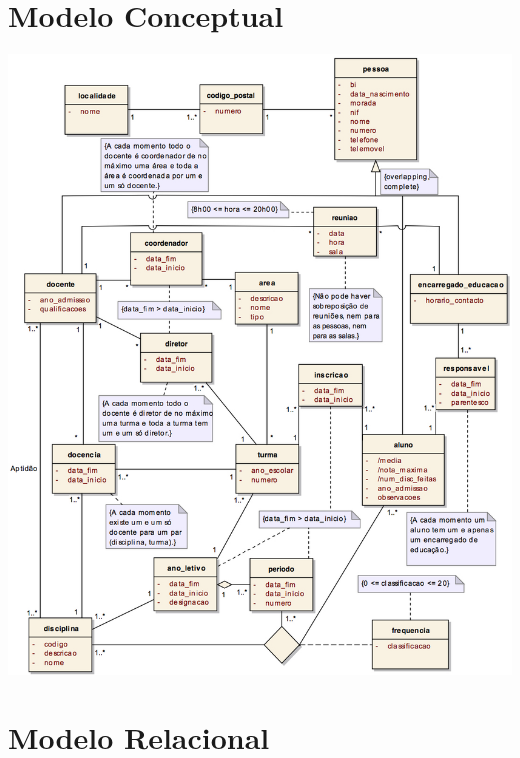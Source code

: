 \documentclass[12pt,a4paper,reqno]{report}
\numberwithin{figure}{section}
\numberwithin{equation}{section}
\begin{document}
\chapter{Modelo Conceptual}

\begin{center}

\includegraphics[width=16cm]{conceptual3.jpg}

\end{center}

\chapter{Modelo Relacional}
\end{document}
